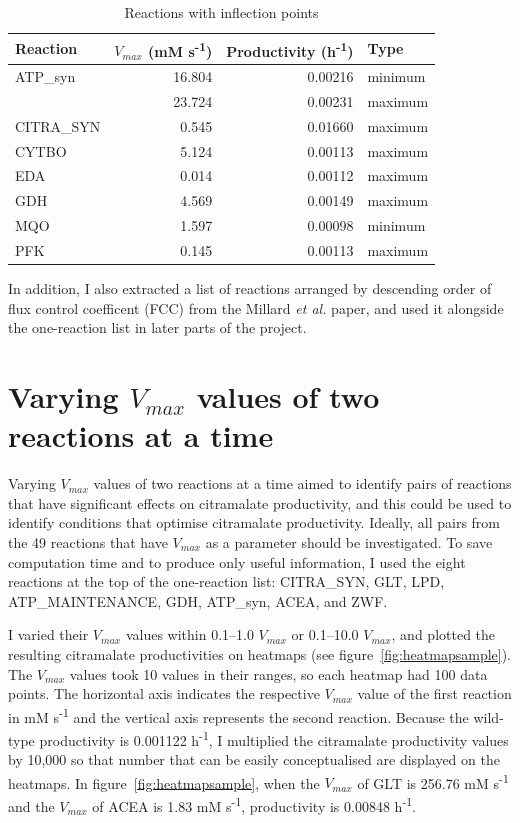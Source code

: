 \documentclass[parskip=full]{scrreprt}
\begin{document}
\begin{table}[htbp]
  \caption{Reactions with inflection points}
  \label{tab:inflection}
  \centering
  \begin{tabular}{lrrl}
    \toprule
    Reaction & $V_{max}$ (mM s\textsuperscript{-1}) & Productivity (h\textsuperscript{-1}) & Type\\
    \midrule
    ATP\_syn & 16.804 & 0.00216 & minimum\\
    & 23.724 & 0.00231 & maximum\\
    CITRA\_SYN & 0.545 & 0.01660 & maximum\\
    CYTBO & 5.124 & 0.00113 & maximum\\
    EDA & 0.014 & 0.00112 & maximum\\
    GDH & 4.569 & 0.00149 & maximum\\
    MQO & 1.597 & 0.00098 & minimum\\
    PFK & 0.145 & 0.00113 & maximum\\
    \bottomrule
  \end{tabular}
\end{table}

In addition, I also extracted a list of reactions arranged by descending order of flux control coefficent (FCC) from the Millard \emph{et al.} paper, and used it alongside the one-reaction list in later parts of the project.

\section{Varying $V_{max}$ values of two reactions at a time}
\label{sec:couples}

Varying $V_{max}$ values of two reactions at a time aimed to identify pairs of reactions that have significant effects on citramalate productivity, and this could be used to identify conditions that optimise citramalate productivity. Ideally, all pairs from the 49 reactions that have $V_{max}$ as a parameter should be investigated. To save computation time and to produce only useful information, I used the eight reactions at the top of the one-reaction list: CITRA\_SYN, GLT, LPD, ATP\_MAINTENANCE, GDH, ATP\_syn, ACEA, and ZWF.

I varied their $V_{max}$ values within 0.1--1.0 $V_{max}$ or 0.1--10.0 $V_{max}$, and plotted the resulting citramalate productivities on heatmaps (see figure~\ref{fig:heatmapsample}). The $V_{max}$ values took 10 values in their ranges, so each heatmap had 100 data points. The horizontal axis indicates the respective $V_{max}$ value of the first reaction in mM s\textsuperscript{-1} and the vertical axis represents the second reaction. Because the wild-type productivity is 0.001122 h\textsuperscript{-1}, I multiplied the citramalate productivity values by 10,000 so that number that can be easily conceptualised are displayed on the heatmaps. In figure~\ref{fig:heatmapsample}, when the $V_{max}$ of GLT is 256.76 mM s\textsuperscript{-1} and the $V_{max}$ of ACEA is 1.83 mM s\textsuperscript{-1}, productivity is 0.00848 h\textsuperscript{-1}.
\end{document}

